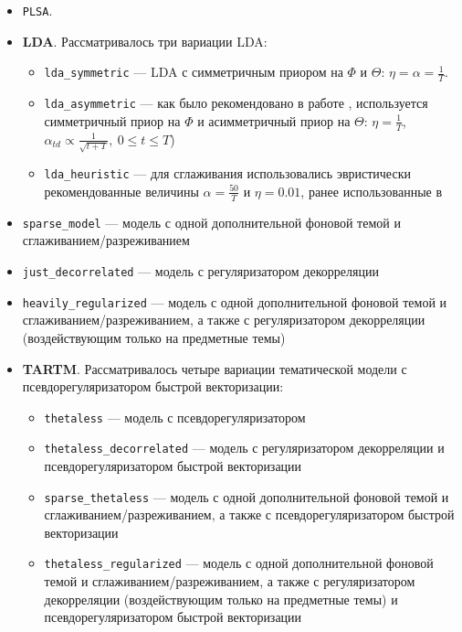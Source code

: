 \begin{itemize} 
    \item \texttt{PLSA}. 
    \item \textbf{LDA}. Рассматривалось три вариации LDA: 
    \begin{itemize} 
        \item \texttt{lda\_symmetric} --- LDA с симметричным приором на $\Phi$ и $\Theta$: $\eta = \alpha = \frac{1}{T}$. 
        \item \texttt{lda\_asymmetric} --- как было рекомендовано в работе \cite{wallach2009rethinking}, используется симметричный приор на $\Phi$ и асимметричный приор на $\Theta$: $\eta=\frac{1}{T}$, $\alpha_{td}\propto\frac{1}{\sqrt{t + T}},~0\leq t \leq T$) 
        \item \texttt{lda\_heuristic} --- для сглаживания использовались эвристически рекомендованные величины $\alpha=\frac{50}{T}$ и $\eta=0.01$, ранее использованные в \cite{biggers2014configuring}\cite{rosen2016mobile} 
    \end{itemize} 

    \item \texttt{sparse\_model} --- модель с одной дополнительной фоновой темой и сглаживанием/разреживанием 
    \item \texttt{just\_decorrelated} --- модель с регуляризатором декорреляции 
    \item \texttt{heavily\_regularized} --- модель с одной дополнительной фоновой темой и сглаживанием/разреживанием, а также с регуляризатором декорреляции (воздействующим только на предметные темы) 
    \item \textbf{TARTM}. Рассматривалось четыре вариации тематической модели с псевдорегуляризатором быстрой векторизации: 
    \begin{itemize} 
        \item \texttt{thetaless} --- модель с псевдорегуляризатором 
        \item \texttt{thetaless\_decorrelated} --- модель с регуляризатором декорреляции и псевдорегуляризатором быстрой векторизации 
        \item \texttt{sparse\_thetaless} --- модель с одной дополнительной фоновой темой и сглаживанием/разреживанием, а также с псевдорегуляризатором быстрой векторизации 
        \item \texttt{thetaless\_regularized} --- модель с одной дополнительной фоновой темой и сглаживанием/разреживанием, а также с регуляризатором декорреляции (воздействующим только на предметные темы) и псевдорегуляризатором быстрой векторизации 
    \end{itemize} 
\end{itemize} 

